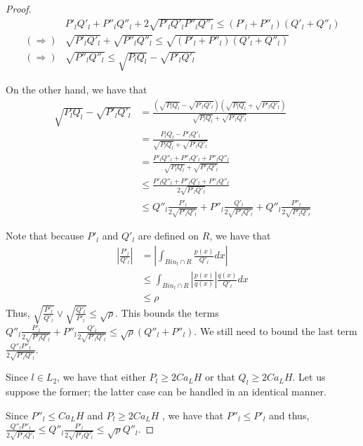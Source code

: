\begin{proof}
\begin{align*}
 & P'_l Q'_l + P''_l Q''_l + 2 \sqrt{P'_l Q'_l P''_l Q''_l } \leq (P'_l + P''_l)(Q'_l + Q''_l) \\
(\Rightarrow) & \sqrt{P'_l Q'_l} + \sqrt{P''_l Q''_l} 
   \leq \sqrt{ (P'_l + P''_l)(Q'_l + Q''_l) } \\
(\Rightarrow) & \sqrt{P''_l Q''_l} \leq \sqrt{ P_l Q_l} - \sqrt{P'_l Q'_l}
\end{align*}




On the other hand, we have that
\begin{align*}
\sqrt{P_l Q_l} - \sqrt{P'_l Q'_l} &= 
    \frac{(\sqrt{P_l Q_l} - \sqrt{P'_l Q'_l} )
          (\sqrt{P_l Q_l} + \sqrt{P'_l Q'_l}) }
     { \sqrt{P_l Q_l} + \sqrt{P'_l Q'_l} } \\
  &= \frac{ P_l Q_l  - P'_l Q'_l }
          {  \sqrt{P_l Q_l} + \sqrt{P'_l Q'_l} }\\
  &= \frac{ P'_l Q''_l + P''_l Q'_l + P''_l Q''_l} 
          {  \sqrt{ P_l Q_l } + \sqrt{P'_l Q'_l} } \\
  &\leq  \frac{ P'_l Q''_l + P''_l Q'_l + P''_l Q''_l} 
          {  2 \sqrt{P'_l Q'_l} } \\
  &\leq Q''_l \frac{P'_l}{2 \sqrt{P'_l Q'_l}} + P''_l \frac{Q'_l}{2\sqrt{P'_l Q'_l}}
        + Q''_l \frac{P''_l}{2 \sqrt{P'_l Q'_l}} 
\end{align*}

Note that because $P'_l$ and $Q'_l$ are defined on $R$, we have that
\begin{align*}
\left| \frac{P'_l}{Q'_l} \right| & =
\left| \int_{Bin_l \cap R} \frac{ p(x)}{Q'_l} dx \right| \\
 &\leq \int_{Bin_l \cap R} \left| \frac{p(x)}{q(x)} \right| \frac{q(x)}{Q'_l} dx \\
 &\leq \rho 
\end{align*}
Thus, $\sqrt{ \frac{P'_l}{Q'_l} } \vee \sqrt{ \frac{Q'_l}{P'_l}} \leq \sqrt{\rho}$. This bounds the terms $ Q''_l \frac{P'_l}{2 \sqrt{P'_l Q'_l}} + P''_l \frac{Q'_l}{2\sqrt{P'_l Q'_l}} \leq \sqrt{\rho} (Q''_l + P''_l)$. We still need to bound the last term $\frac{Q''_l P''_l}{2 \sqrt{P'_l Q'_l}}$.


Since $l \in L_2$, we have that either $P_l \geq 2 C a_L H$ or that $Q_l \geq 2 C a_L H$. Let us suppose the former; the latter case can be handled in an identical manner.

Since $P''_l \leq C a_L H$ and $P_l \geq 2C a_L H$ , we have that $P''_l \leq P'_l$ and thus, 
$\frac{Q''_l P''_l}{2 \sqrt{P'_l Q'_l}} \leq Q''_l \frac{P'_l}{2 \sqrt{P'_l Q'_l}} \leq \sqrt{\rho} Q''_l$.


\end{proof}
